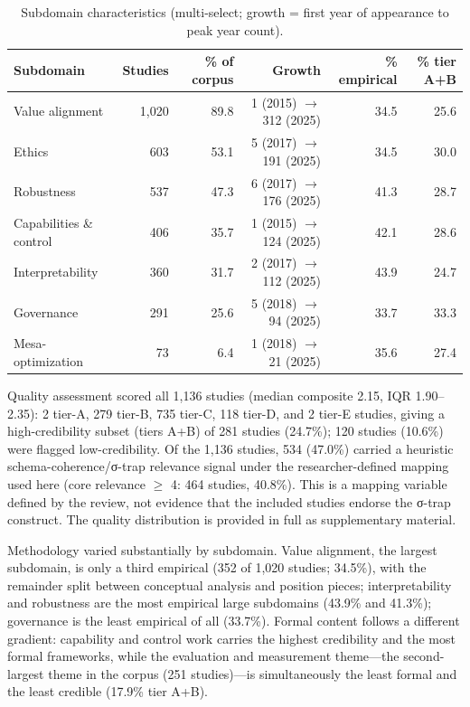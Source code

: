 \begin{table}[htbp]
\centering
\caption{Subdomain characteristics (multi-select; growth = first year of appearance to peak year count).}
\label{tab:subdomains}
\begin{tabular}{lrrrrr}
\toprule
Subdomain & Studies & \% of corpus & Growth & \% empirical & \% tier A+B \\
\midrule
Value alignment & 1,020 & 89.8 & 1 (2015) $\rightarrow$ 312 (2025) & 34.5 & 25.6 \\
Ethics & 603 & 53.1 & 5 (2017) $\rightarrow$ 191 (2025) & 34.5 & 30.0 \\
Robustness & 537 & 47.3 & 6 (2017) $\rightarrow$ 176 (2025) & 41.3 & 28.7 \\
Capabilities \& control & 406 & 35.7 & 1 (2015) $\rightarrow$ 124 (2025) & 42.1 & 28.6 \\
Interpretability & 360 & 31.7 & 2 (2017) $\rightarrow$ 112 (2025) & 43.9 & 24.7 \\
Governance & 291 & 25.6 & 5 (2018) $\rightarrow$ 94 (2025) & 33.7 & 33.3 \\
Mesa-optimization & 73 & 6.4 & 1 (2018) $\rightarrow$ 21 (2025) & 35.6 & 27.4 \\
\bottomrule
\end{tabular}
\end{table}

Quality assessment scored all 1,136 studies (median composite 2.15, IQR 1.90--2.35): 2 tier-A, 279 tier-B, 735 tier-C, 118 tier-D, and 2 tier-E studies, giving a high-credibility subset (tiers A+B) of 281 studies (24.7\%); 120 studies (10.6\%) were flagged low-credibility. Of the 1,136 studies, 534 (47.0\%) carried a heuristic schema-coherence/σ-trap relevance signal under the researcher-defined mapping used here (core relevance $\geq$ 4: 464 studies, 40.8\%). This is a mapping variable defined by the review, not evidence that the included studies endorse the σ-trap construct. The quality distribution is provided in full as supplementary material.

Methodology varied substantially by subdomain. Value alignment, the largest subdomain, is only a third empirical (352 of 1,020 studies; 34.5\%), with the remainder split between conceptual analysis and position pieces; interpretability and robustness are the most empirical large subdomains (43.9\% and 41.3\%); governance is the least empirical of all (33.7\%). Formal content follows a different gradient: capability and control work carries the highest credibility and the most formal frameworks, while the evaluation and measurement theme---the second-largest theme in the corpus (251 studies)---is simultaneously the least formal and the least credible (17.9\% tier A+B).

